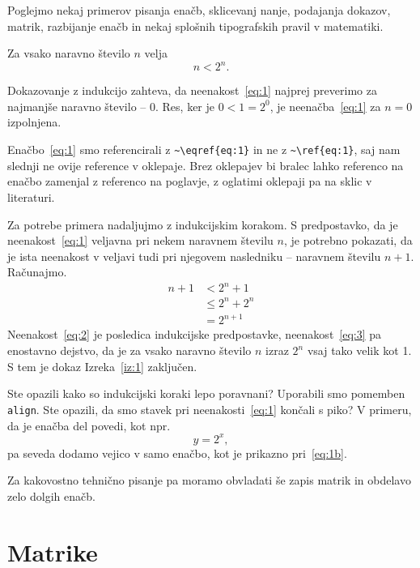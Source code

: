 \documentclass[a4paper,12pt,openright]{book}
\begin{document}
Poglejmo nekaj primerov pisanja enačb, sklicevanj nanje, podajanja dokazov, matrik, razbijanje enačb in nekaj splošnih tipografskih pravil v matematiki.
\begin{izrek}
  \label{iz:1}
  Za vsako naravno število $n$ velja
  \begin{equation}
    n < 2^n.
    \label{eq:1}
  \end{equation}
\end{izrek}

\begin{dokaz}
  Dokazovanje z indukcijo zahteva, da neenakost~\eqref{eq:1} najprej preverimo za najmanjše naravno število -- $0$.
  Res, ker je $0 < 1 = 2^0$, je neenačba~\eqref{eq:1} za $n=0$ izpolnjena.

  Enačbo~\eqref{eq:1} smo referencirali z \verb|~\eqref{eq:1}| in ne z \verb|~\ref{eq:1}|, saj nam slednji ne ovije reference v oklepaje. Brez oklepajev bi bralec lahko referenco na enačbo zamenjal z referenco na poglavje, z oglatimi oklepaji pa na sklic v literaturi.
  
  Za potrebe primera nadaljujmo z indukcijskim korakom. S predpostavko, da je neenakost~\eqref{eq:1} veljavna pri nekem naravnem številu $n$, je potrebno pokazati, da je ista neenakost v veljavi tudi pri njegovem nasledniku -- naravnem številu $n+1$.
  Računajmo.
  \begin{align}
    n+1 & < 2^n + 1       \label{eq:2}\\
    & \le 2^n + 2^n \label{eq:3}\\
    & = 2^{n+1}       \nonumber
  \end{align}
  Neenakost~\eqref{eq:2} je posledica indukcijske predpostavke, neenakost~\eqref{eq:3} pa enostavno dejstvo, da je za vsako naravno število $n$ izraz $2^n$ vsaj tako velik kot 1.
  S tem je dokaz Izreka~\ref{iz:1} zaključen.
\end{dokaz}

Ste opazili kako so indukcijski koraki lepo poravnani? Uporabili smo pomemben \texttt{align}. Ste opazili, da smo stavek pri neenakosti~\ref{eq:1} končali s piko? V primeru, da je enačba del povedi, kot npr.
 \begin{equation}
    y = 2^x,
    \label{eq:1b}
  \end{equation}
pa seveda dodamo vejico v samo enačbo, kot je prikazno pri~\eqref{eq:1b}.

Za kakovostno tehnično pisanje pa moramo obvladati še zapis matrik in obdelavo zelo dolgih enačb.

\section{Matrike}
\end{document}
